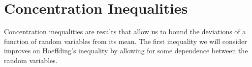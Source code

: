\chapter{Concentration Inequalities}

Concentration inequalities are results that allow us to bound the deviations of a function of random variables from its mean. The first inequality we will consider improves on Hoeffding's inequality by allowing for some dependence between the random variables.

